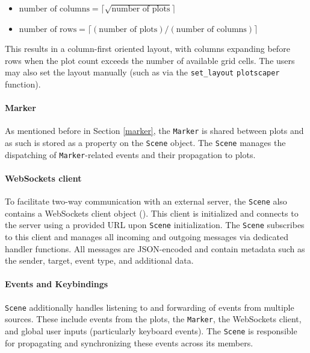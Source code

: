 \documentclass[
  openany]{book}
\providecommand{\tightlist}{%
  \setlength{\itemsep}{0pt}\setlength{\parskip}{0pt}}
\theoremstyle{definition}
\theoremstyle{definition}
\theoremstyle{definition}
\theoremstyle{definition}
\theoremstyle{remark}
\begin{document}
\begin{itemize}
\tightlist
\item
  \(\text{number of columns} = \lceil \sqrt{ \text{number of plots}}  \rceil\)
\item
  \(\text{number of rows} = \lceil (\text{number of plots}) / (\text{number of columns}) \rceil\)
\end{itemize}

This results in a column-first oriented layout, with columns expanding before rows when the plot count exceeds the number of available grid cells. The users may also set the layout manually (such as via the \texttt{set\_layout} \texttt{plotscaper} function).

\paragraph{Marker}\label{marker-1}

As mentioned before in Section \ref{marker}, the \texttt{Marker} is shared between plots and as such is stored as a property on the \texttt{Scene} object. The \texttt{Scene} manages the dispatching of \texttt{Marker}-related events and their propagation to plots.

\paragraph{WebSockets client}\label{websockets-client}

To facilitate two-way communication with an external server, the \texttt{Scene} also contains a WebSockets client object (). This client is initialized and connects to the server using a provided URL upon \texttt{Scene} initialization. The \texttt{Scene} subscribes to this client and manages all incoming and outgoing messages via dedicated handler functions. All messages are JSON-encoded and contain metadata such as the sender, target, event type, and additional data.

\paragraph{Events and Keybindings}\label{events-and-keybindings}

\texttt{Scene} additionally handles listening to and forwarding of events from multiple sources. These include events from the plots, the \texttt{Marker}, the WebSockets client, and global user inputs (particularly keyboard events). The \texttt{Scene} is responsible for propagating and synchronizing these events across its members.
\end{document}
